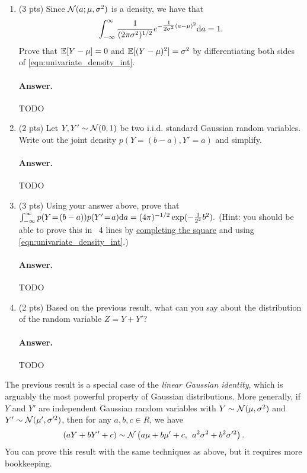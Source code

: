 \documentclass[11pt,letterpaper]{article}
\newenvironment{answer}{%
    \vspace{1em}
    \color{black}
    \paragraph{Answer.}
  }{%
    \vspace{1em}
  }
\begin{document}
\begin{enumerate}
  \item (3 pts) Since $\mathcal{N}(a; \mu, \sigma^2)$ is a density, we have that
    \begin{equation}
      \int_{-\infty}^\infty \frac{1}{(2 \pi \sigma^2)^{1/2}} e^{-\tfrac{1}{2 \sigma^2} (a - \mu)^2} \textrm{d} a = 1.
      \label{eqn:univariate_density_int}
    \end{equation}
    Prove that $\mathbb{E}[Y - \mu] = 0$ and $\mathbb{E}[(Y - \mu)^2] = \sigma^2$ by differentiating both sides of \cref{eqn:univariate_density_int}.

\begin{answer}
  TODO
\end{answer}

  \item (2 pts) Let $Y, Y' \sim \mathcal{N}(0, 1)$ be two i.i.d. standard Gaussian random variables.
    Write out the joint density $p(Y\!=\!(b-a), Y'\!=\!a)$ and simplify.

\begin{answer}
  TODO
\end{answer}

  \item (3 pts) Using your answer above, prove that
    $\int_{-\infty}^{\infty} p(Y\!=\!(b-a)) p(Y'\!=\!a) \textrm{d} a = (4\pi)^{-1/2} \exp(-\tfrac{1}{2^2} b^2).$
    (Hint: you should be able to prove this in ~4 lines by \href{https://en.wikipedia.org/wiki/Completing_the_square}{completing the square}
    and using \cref{eqn:univariate_density_int}.)

\begin{answer}
  TODO
\end{answer}

  \item (2 pts) Based on the previous result, what can you say about the distribution of the random variable $Z = Y + Y'$?

\begin{answer}
  TODO
\end{answer}

\end{enumerate}

The previous result is a special case of the \emph{linear Gaussian identity}, which is arguably the most powerful property of Gaussian distributions.
More generally, if $Y$ and $Y'$ are independent Gaussian random variables with
$Y \sim \mathcal{N}(\mu, \sigma^2)$ and $Y' \sim \mathcal{N}(\mu', \sigma^{\prime2})$, then for any $a, b, c \in R$, we have
%
\begin{align}
  (aY + bY' + c) \sim \mathcal{N}\left(
    a\mu + b\mu' + c,
    \:\:
    a^2 \sigma^2 + b^2 \sigma^{\prime 2}
  \right).
  \label{eqn:univariate_sum}
\end{align}
%
You can prove this result with the same techniques as above, but it requires more bookkeeping.
\end{document}
